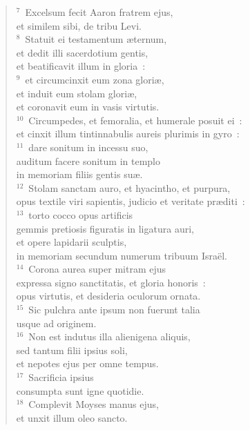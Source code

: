 \begin{flushleft}\begin{verse}${}^{7}$~Excelsum fecit Aaron fratrem ejus,\\ et similem sibi, de tribu Levi.\\
${}^{8}$~Statuit ei testamentum \ae ternum,\\ et dedit illi sacerdotium gentis,\\ et beatificavit illum in gloria~:\\
${}^{9}$~et circumcinxit eum zona glori\ae ,\\ et induit eum stolam glori\ae ,\\ et coronavit eum in vasis virtutis.\\
${}^{10}$~Circumpedes, et femoralia, et humerale posuit ei~:\\ et cinxit illum tintinnabulis aureis plurimis in gyro~:\\
${}^{11}$~dare sonitum in incessu suo,\\ auditum facere sonitum in templo\\ in memoriam filiis gentis su\ae .\\
${}^{12}$~Stolam sanctam auro, et hyacintho, et purpura,\\ opus textile viri sapientis, judicio et veritate pr\ae diti~:\\
${}^{13}$~torto cocco opus artificis\\ gemmis pretiosis figuratis in ligatura auri,\\ et opere lapidarii sculptis,\\ in memoriam secundum numerum tribuum Isra\"el.\\
${}^{14}$~Corona aurea super mitram ejus\\ expressa signo sanctitatis, et gloria honoris~:\\ opus virtutis, et desideria oculorum ornata.\\
${}^{15}$~Sic pulchra ante ipsum non fuerunt talia\\ usque ad originem.\\
${}^{16}$~Non est indutus illa alienigena aliquis,\\ sed tantum filii ipsius soli,\\ et nepotes ejus per omne tempus.\\
${}^{17}$~Sacrificia ipsius\\ consumpta sunt igne quotidie.\\
${}^{18}$~Complevit Moyses manus ejus,\\ et unxit illum oleo sancto.\\

\end{verse}
\end{flushleft}
